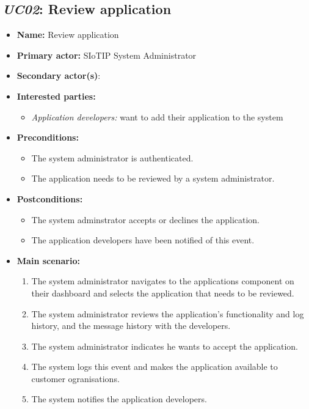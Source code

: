 \subsection{\emph{UC02}: Review application}
\begin{itemize}
    \item \textbf{Name:} Review application
    \item \textbf{Primary actor:} SIoTIP System Administrator
    \item \textbf{Secondary actor(s)}:
    \item \textbf{Interested parties:}
        \begin{itemize}
            \item \textit{Application developers:} want to add their application to the system
        \end{itemize}

    \item \textbf{Preconditions:}
        \begin{itemize}
            \item The system administrator is authenticated.
            \item The application needs to be reviewed by a system administrator.
        \end{itemize}

    \item \textbf{Postconditions:}
        \begin{itemize}
            \item The system adminstrator accepts or declines the application.
            \item The application developers have been notified of this event.
        \end{itemize}

    \item \textbf{Main scenario:}
        \begin{enumerate}
            \item The system administrator navigates to the applications component on their
                  dashboard and selects the application that needs to be reviewed.
            \item The system administrator reviews the application's functionality and
                  log history, and the message history with the developers.
            \item The system administrator indicates he wants to accept the application.
            \item The system logs this event and makes the application available to
                  customer ogranisations.
            \item The system notifies the application developers.
        \end{enumerate}


\end{itemize}

